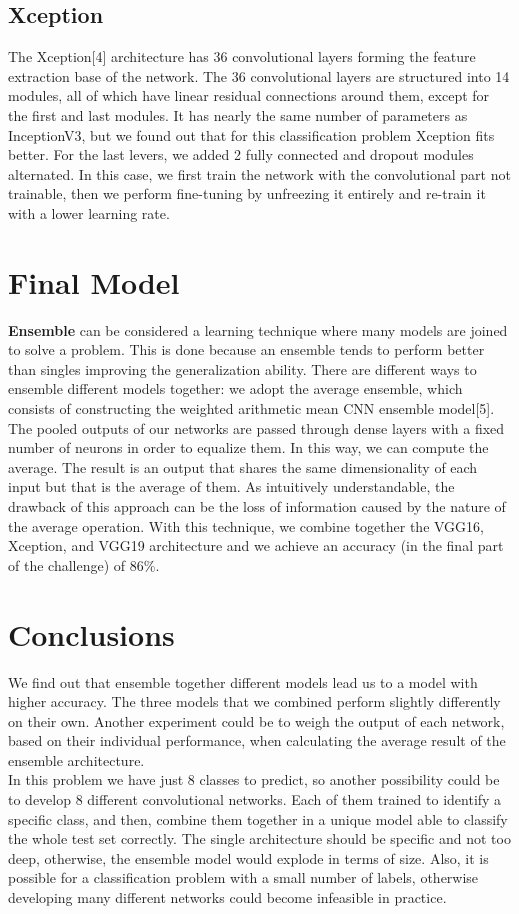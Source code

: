 \documentclass[11pt, oneside]{article}
\begin{document}
\subsection{Xception}
The Xception[4] architecture has 36 convolutional layers forming the feature extraction base of the network. The 36 convolutional layers are structured into 14 modules, all of which have linear residual connections around them, except for the first and last modules. It has nearly the same number of parameters as InceptionV3, but we found out that for this classification problem Xception fits better. For the last levers, we added 2 fully connected and dropout modules alternated. In this case, we first train the network with the convolutional part not trainable, then we perform fine-tuning by unfreezing it entirely and re-train it with a lower learning rate.
\section{Final Model}
\textbf{Ensemble} can be considered a learning technique where many models are joined to solve a problem. This is done because an ensemble tends to perform better than singles improving the generalization ability. There are different ways to ensemble different models together: we adopt the average ensemble, which consists of constructing the weighted arithmetic mean CNN ensemble model[5]. The pooled outputs of our networks are passed through dense layers with a fixed number of neurons in order to equalize them. In this way, we can compute the average. The result is an output that shares the same dimensionality of each input but that is the average of them. As intuitively understandable, the drawback of this approach can be the loss of information caused by the nature of the average operation. With this technique, we combine together the VGG16, Xception, and VGG19 architecture and we achieve an accuracy (in the final part of the challenge) of 86\%.
\section{Conclusions}
We find out that ensemble together different models lead us to a model with higher accuracy. The three models that we combined perform slightly differently on their own. Another experiment could be to weigh the output of each network, based on their individual performance, when calculating the average result of the ensemble architecture.\\
In this problem we have just 8 classes to predict, so another possibility could be to develop 8 different convolutional networks. Each of them trained to identify a specific class, and then, combine them together in a unique model able to classify the whole test set correctly. The single architecture should be specific and not too deep, otherwise, the ensemble model would explode in terms of size. Also, it is possible for a classification problem with a small number of labels, otherwise developing many different networks could become infeasible in practice.
\end{document}

